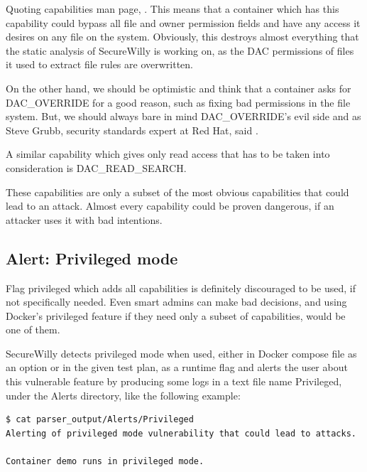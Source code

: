 \begin{description}[style=nextline]
\item[DAC\_OVERRIDE]
Quoting capabilities man page, .
This means that a container which has this capability could bypass all file and owner permission fields and have any access it desires on any file on the system. Obviously, this destroys almost everything that the static analysis of SecureWilly is working on, as the DAC permissions of files it used to extract file rules are overwritten. 

On the other hand, we should be optimistic and think that a container asks for DAC\_OVERRIDE for a good reason, such as fixing bad permissions in the file system.
But, we should always bare in mind DAC\_OVERRIDE's evil side and as Steve Grubb, security standards expert at Red Hat, said .

A similar capability which gives only read access that has to be taken into consideration is DAC\_READ\_SEARCH.
\end{description}

These capabilities are only a subset of the most obvious capabilities that could lead to an attack. Almost every capability could be proven dangerous, if an attacker uses it with bad intentions. 

\subsection{Alert: Privileged mode}
Flag privileged which adds all capabilities is definitely discouraged to be used, if not specifically needed. Even smart admins can make bad decisions, and using Docker's privileged feature if they need only a subset of capabilities, would be one of them. 

SecureWilly detects privileged mode when used, either in Docker compose file as an option or in the given test plan, as a runtime flag and alerts the user about this vulnerable feature by producing some logs in a text file name Privileged, under the Alerts directory, like the following example:

\begin{lstlisting}[style=terminal]
$ cat parser_output/Alerts/Privileged
Alerting of privileged mode vulnerability that could lead to attacks.

Container demo runs in privileged mode.
\end{lstlisting}

